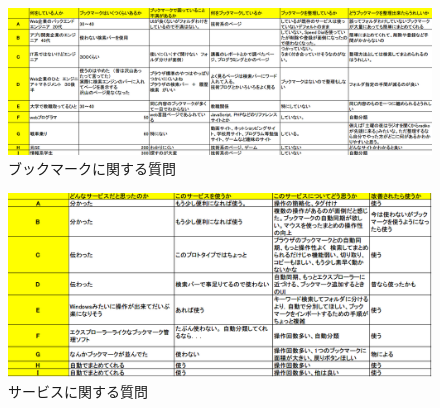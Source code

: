 \documentclass[a4paper,10pt,fleqn]{jsarticle}
\begin{document}
\begin{figure}[htbp]
  \begin{center}
    \includegraphics[width=14cm]{./interview-res-1.png}
    \caption{ブックマークに関する質問}
  \end{center}
\end{figure}
\begin{figure}[htbp]
  \begin{center}
    \includegraphics[width=14cm]{./interview-res-2.png}
    \caption{サービスに関する質問}
  \end{center}
\end{figure}
\end{document}
